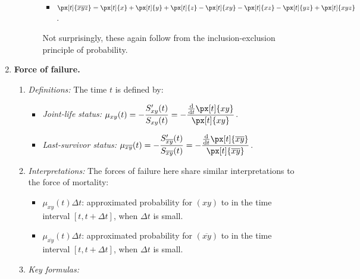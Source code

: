 \begin{enumerate}
\begin{enumerate}[label={(\arabic*)}]
\begin{enumerate}[label={(\roman*)}]
\begin{itemize}
\item \(\px[t]{\overline{xyz}}=\px[t]{x}+\px[t]{y}+\px[t]{z}-\px[t]{xy}-\px[t]{xz}
-\px[t]{yz}+\px[t]{xyz}\).
\end{itemize}
\begin{note}
Not surprisingly, these again follow from the inclusion-exclusion principle of
probability.
\end{note}
\end{enumerate}
\end{enumerate}
\item \textbf{Force of failure.}
\begin{enumerate}[label={(\arabic*)}]
\item \emph{Definitions:} The   time \(t\) is
defined by:
\begin{itemize}
\item \emph{Joint-life status:}
\(\displaystyle \mu_{xy}(t)=-\frac{S_{xy}'(t)}{S_{xy}(t)}=-\frac{\dv{}{t}\px[t]{xy}}{\px[t]{xy}}\).
\item \emph{Last-survivor status:}
\(\displaystyle \mu_{\overline{xy}}(t)=-\frac{S_{\overline{xy}}'(t)}{S_{\overline{xy}}(t)}
=-\frac{\dv{}{t}\px[t]{\overline{xy}}}{\px[t]{\overline{xy}}}\).
\end{itemize}

\item \emph{Interpretations:} The forces of failure here share similar
interpretations to the force of mortality:
\begin{itemize}
\item \(\mu_{xy}(t)\Delta t\): approximated probability for \((xy)\) to
 in the time interval \([t,t+\Delta t]\), when \(\Delta t\) is small.
\item \(\mu_{\overline{xy}}(t)\Delta t\): approximated probability for
\((\overline{xy})\) to  in the time interval \([t,t+\Delta t]\), when
\(\Delta t\) is small.
\end{itemize}
\item \emph{Key formulas:}
\end{enumerate}
\end{enumerate}
